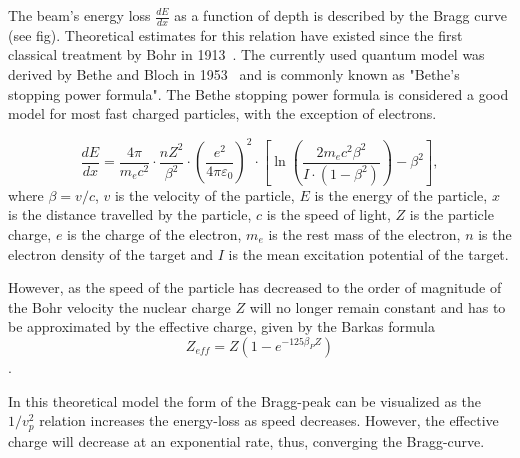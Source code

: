 The beam's energy loss $\frac{dE}{dx}$ as a function of depth is described by the Bragg curve (see fig). %
 Theoretical estimates for this relation have existed since the first classical treatment by Bohr in 1913~\cite{bohr13}. The currently used quantum model was derived by Bethe and Bloch in 1953~\cite{bethebloch53}  and is commonly known as "Bethe's stopping power formula". The Bethe stopping power formula is considered a good model for most fast charged particles, with the exception of electrons.

\begin{equation}
 \frac{dE}{dx} = \frac{4 \pi}{m_e c^2} \cdot \frac{nZ^2}{\beta^2} \cdot \left(\frac{e^2}{4\pi\varepsilon_0}\right)^2 \cdot \left[\ln \left(\frac{2m_e c^2 \beta^2}{I \cdot (1-\beta^2)}\right) - \beta^2\right],
\label{bethebloch}
\end{equation}
where $\beta = v/c $, 
$v$ is the velocity of the particle,
$E$ is the 
energy of the particle,
$x$ is the 
distance travelled by the particle,
$c$ is the 
speed of light,
$Z$ is the 
particle charge,
$e$ is the 
charge of the electron,
$m_e$ is the 
rest mass of the electron,
$n$ is the 
electron density of the target and 
$I$  is the 
mean excitation potential of the target.


However, as the speed of the particle has decreased to the order of magnitude of the Bohr velocity the nuclear charge $Z$ will no longer remain constant and has to be approximated by the effective charge, given by the Barkas formula $$Z_{eff} = Z(1-e^{-125\beta_{P}Z})$$.

In this theoretical model the form of the Bragg-peak can be visualized as the $1/v_{p}^2$ relation increases the energy-loss as speed decreases. However, the effective charge will decrease at an exponential rate, thus, converging the Bragg-curve.

